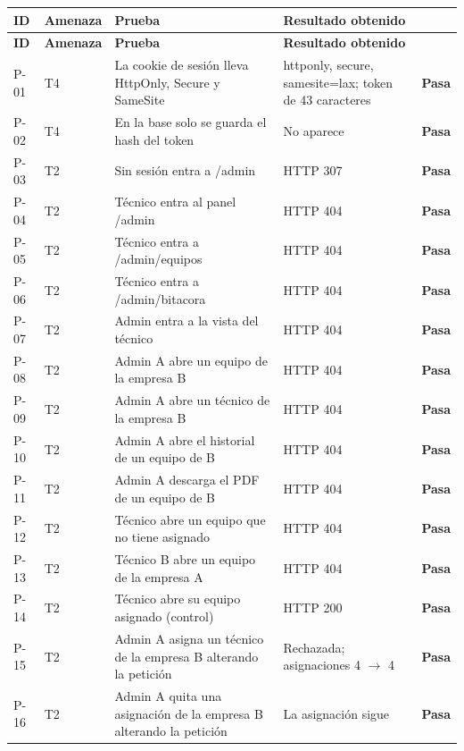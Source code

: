 \documentclass[12pt, letterpaper]{article}
\begin{document}
\begingroup\small\setlength{\tabcolsep}{4pt}\renewcommand{\arraystretch}{1.25}
\begin{longtable}{L{0.07}L{0.08}L{0.36}L{0.34}L{0.08}}
\toprule
\textbf{ID} & \textbf{Amenaza} & \textbf{Prueba} & \textbf{Resultado obtenido} & \textbf{} \\
\midrule
\endfirsthead
\toprule
\textbf{ID} & \textbf{Amenaza} & \textbf{Prueba} & \textbf{Resultado obtenido} & \textbf{} \\
\midrule
\endhead
\bottomrule
\endfoot
P-01 & T4 & La cookie de sesión lleva HttpOnly, Secure y SameSite & httponly, secure, samesite=lax; token de 43 caracteres & \textbf{Pasa} \\
P-02 & T4 & En la base solo se guarda el hash del token & No aparece & \textbf{Pasa} \\
P-03 & T2 & Sin sesión entra a /admin & HTTP 307 & \textbf{Pasa} \\
P-04 & T2 & Técnico entra al panel /admin & HTTP 404 & \textbf{Pasa} \\
P-05 & T2 & Técnico entra a /admin/equipos & HTTP 404 & \textbf{Pasa} \\
P-06 & T2 & Técnico entra a /admin/bitacora & HTTP 404 & \textbf{Pasa} \\
P-07 & T2 & Admin entra a la vista del técnico & HTTP 404 & \textbf{Pasa} \\
P-08 & T2 & Admin A abre un equipo de la empresa B & HTTP 404 & \textbf{Pasa} \\
P-09 & T2 & Admin A abre un técnico de la empresa B & HTTP 404 & \textbf{Pasa} \\
P-10 & T2 & Admin A abre el historial de un equipo de B & HTTP 404 & \textbf{Pasa} \\
P-11 & T2 & Admin A descarga el PDF de un equipo de B & HTTP 404 & \textbf{Pasa} \\
P-12 & T2 & Técnico abre un equipo que no tiene asignado & HTTP 404 & \textbf{Pasa} \\
P-13 & T2 & Técnico B abre un equipo de la empresa A & HTTP 404 & \textbf{Pasa} \\
P-14 & T2 & Técnico abre su equipo asignado (control) & HTTP 200 & \textbf{Pasa} \\
P-15 & T2 & Admin A asigna un técnico de la empresa B alterando la petición & Rechazada; asignaciones 4 $\rightarrow$ 4 & \textbf{Pasa} \\
P-16 & T2 & Admin A quita una asignación de la empresa B alterando la petición & La asignación sigue & \textbf{Pasa} \\

\end{longtable}
\end{document}
